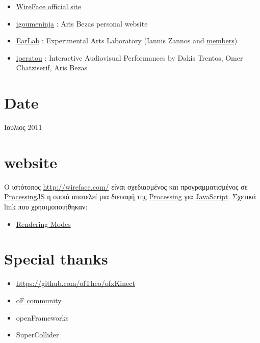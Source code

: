 \documentclass[11pt]{article}
\begin{document}
\begin{itemize}
\item \href{http://wireface.com/}{WireFace official site}
\item \href{http://igoumeninja.org/}{igoumeninja} : Aris Bezas personal website
\item \href{http://earlab.org/}{EarLab} : Experimental Arts Laboratory (Iannis Zannos and \href{http://earlab.org/pmwiki.php?n=Members/HomePage}{members})
\item \href{http://iperatou.com/}{iperatou} : Interactive Audiovisual Performances by Dakis Trentos, Omer Chatziserif, Aris Bezas
\end{itemize}
\section{Date}
\label{sec-5}

Ιούλιος 2011
\section{website}
\label{sec-6}

Ο ιστότοπος \href{http://wireface.com/}{http://wireface.com/} είναι σχεδιασμένος και προγραμματισμένος σε \href{http://processingjs.org/}{ProcessingJS} η οποιά αποτελεί μια διεπαφή της \href{http://processing.org/}{Processing} για \href{http://en.wikipedia.org/wiki/JavaScript}{JavaScript}. 
Σχετικά link που χρησιμοποιήθηκαν:
\begin{itemize}
\item \href{http://processingjs.org/reference/articles/RenderingModes}{Rendering Modes}
\end{itemize}
\section{Special thanks}
\label{sec-7}

\begin{itemize}
\item \href{https://github.com/ofTheo/ofxKinect}{https://github.com/ofTheo/ofxKinect}
\item \href{http://forum.openframeworks.cc/index.php?topic=4947.0}{oF community}
\item openFrameworks
\item SuperCollider
\end{itemize}
\end{document}
